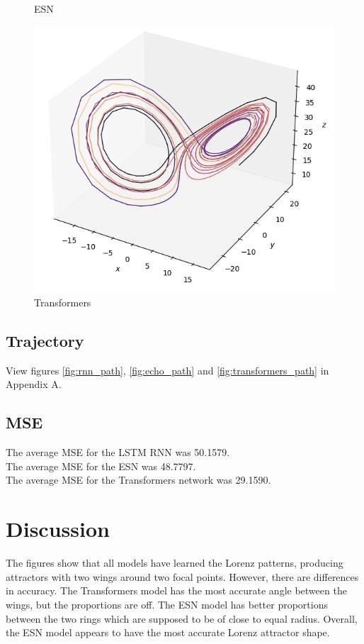 \documentclass[11pt]{article}
\begin{document}
\begin{figure}[ht]
\begin{minipage}{0.32\textwidth}
        \caption{ESN}
        \label{fig:echo_lorenz}
    \end{minipage}
    \hfill
    \begin{minipage}{0.32\textwidth}
        \centering
        \includegraphics[width=\textwidth]{transformers_lorenz.jpeg}
        \caption{Transformers}
        \label{fig:transformers_lorenz}
    \end{minipage}
\end{figure}

\subsection{Trajectory}
View figures \ref{fig:rnn_path}, \ref{fig:echo_path} and \ref{fig:transformers_path} in Appendix A.
\subsection{MSE}
The average MSE for the LSTM RNN was 50.1579. \\
The average MSE for the ESN was 48.7797. \\
The average MSE for the Transformers network was 29.1590. 
\section{Discussion}
The figures show that all models have learned the Lorenz patterns, producing attractors with two wings around two focal points. However, there are differences in accuracy. The Transformers model has the most accurate angle between the wings, but the proportions are off. The ESN model has better proportions between the two rings which are supposed to be of close to equal radius. Overall, the ESN model appears to have the most accurate Lorenz attractor shape.
\end{document}
